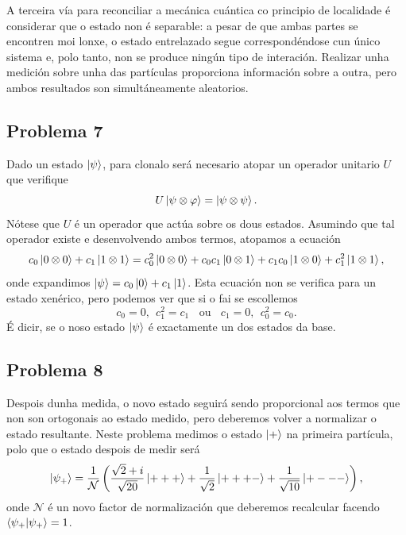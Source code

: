 \documentclass[a4paper,12pt]{article}
\begin{document}
A terceira vía para reconciliar a mecánica cuántica co principio de localidade é considerar que o estado non é separable: a pesar de que ambas partes se encontren moi lonxe, o estado entrelazado segue correspondéndose cun único sistema e, polo tanto, non se produce ningún tipo de interación. Realizar unha medición sobre unha das partículas proporciona información sobre a outra, pero ambos resultados son simultáneamente aleatorios.

\subsection*{Problema 7}

Dado un estado $\ket{\psi}$, para clonalo será necesario atopar un operador unitario $U$ que verifique
\begin{equation}
	U\ket{\psi \otimes \varphi} = \ket{\psi \otimes \psi}.
\end{equation}
\noindent
Nótese que $U$ é un operador que actúa sobre os dous estados. Asumindo que tal operador existe e desenvolvendo ambos termos, atopamos a ecuación
\begin{equation}
	c_0 \ket{0 \otimes 0} + c_1 \ket{1 \otimes 1} = c_0^2\ket{0 \otimes 0} + c_0 c_1 \ket{0 \otimes 1} + c_1 c_0 \ket{1 \otimes 0} + c_1^2 \ket{1 \otimes 1},
\end{equation} 
\noindent
onde expandimos $\ket{\psi} = c_0\ket{0} + c_1 \ket{1}$. Esta ecuación non se verifica para un estado xenérico, pero podemos ver que si o fai se escollemos
\begin{equation}
	c_0 = 0, ~~ c_1^2 = c_1 ~~~~\text{ou}~~~~ c_1 = 0, ~~ c_0^2 = c_0.
\end{equation}
\noindent
É dicir, se o noso estado $\ket{\psi}$ é exactamente un dos estados da base.

\subsection*{Problema 8}

Despois dunha medida, o novo estado seguirá sendo proporcional aos termos que non son ortogonais ao estado medido, pero deberemos volver a normalizar o estado resultante. Neste problema medimos o estado $\ket{+}$ na primeira partícula, polo que o estado despois de medir será
\begin{equation}
	\ket{\psi_+} = \frac{1}{\mathcal{N}} \left(\frac{\sqrt{2} + i}{\sqrt{20}}\ket{+++} + \frac{1}{\sqrt{2}}\ket{+++-} + \frac{1}{\sqrt{10}}\ket{+---} \right),
\end{equation}
\noindent
onde $\mathcal{N}$ é un novo factor de normalización que deberemos recalcular facendo $\braket{\psi_+}{\psi_+} = 1$.
\end{document}

